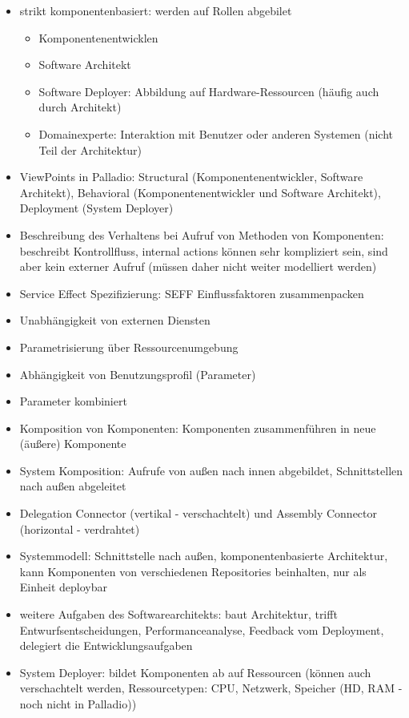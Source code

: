 \documentclass[paper=a4, fontsize=11pt]{scrartcl} %
\numberwithin{equation}{section} %
\numberwithin{figure}{section} %
\numberwithin{table}{section} %
\begin{document}
\begin{itemize}
\begin{itemize}
\begin{itemize}
      \item strikt komponentenbasiert: werden auf Rollen abgebilet
      \begin{itemize}
        \item Komponentenentwicklen
        \item Software Architekt
        \item Software Deployer: Abbildung auf Hardware-Ressourcen (häufig auch durch Architekt)
        \item Domainexperte: Interaktion mit Benutzer oder anderen Systemen (nicht Teil der Architektur)
      \end{itemize}
      \item ViewPoints in Palladio: Structural (Komponentenentwickler, Software Architekt), Behavioral (Komponentenentwickler und Software Architekt), Deployment (System Deployer)
      \item Beschreibung des Verhaltens bei Aufruf von Methoden von Komponenten: beschreibt Kontrollfluss, internal actions können sehr kompliziert sein, sind aber kein externer Aufruf (müssen daher nicht weiter modelliert werden)
      \item Service Effect Spezifizierung: SEFF Einflussfaktoren zusammenpacken
      \item Unabhängigkeit von externen Diensten
      \item Parametrisierung über Ressourcenumgebung
      \item Abhängigkeit von Benutzungsprofil (Parameter)
      \item Parameter kombiniert
      \item Komposition von Komponenten: Komponenten zusammenführen in neue (äußere) Komponente
      \item System Komposition: Aufrufe von außen nach innen abgebildet, Schnittstellen nach außen abgeleitet
      \item Delegation Connector (vertikal - verschachtelt) und Assembly Connector (horizontal - verdrahtet)
      \item Systemmodell: Schnittstelle nach außen, komponentenbasierte Architektur, kann Komponenten von verschiedenen Repositories beinhalten, nur als Einheit deploybar
      \item weitere Aufgaben des Softwarearchitekts: baut Architektur, trifft Entwurfsentscheidungen, Performanceanalyse, Feedback vom Deployment, delegiert die Entwicklungsaufgaben
      \item System Deployer: bildet Komponenten ab auf Ressourcen (können auch verschachtelt werden, Ressourcetypen: CPU, Netzwerk, Speicher (HD, RAM - noch nicht in Palladio))

\end{itemize}
\end{itemize}
\end{itemize}
\end{document}
